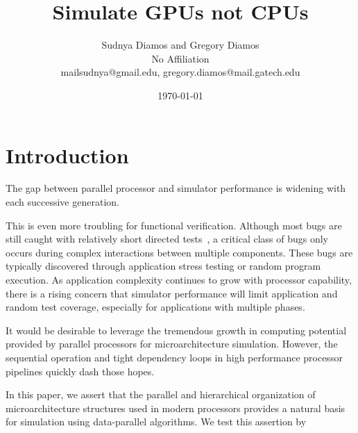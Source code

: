 \documentclass[conference, 10pt]{IEEEtran}
\begin{document}
 

\title{Simulate GPUs not CPUs}

\author{Sudnya Diamos and Gregory Diamos  \\
No Affiliation \\
{\small mailsudnya@gmail.edu, gregory.diamos@mail.gatech.edu}}
\date{\today}

\maketitle

\section{Introduction}

The gap between parallel processor and simulator performance is widening with
each successive generation.  


This is even more troubling for functional verification.  Although most bugs are
still caught with relatively short directed tests~\cite{ref:bug-distributions},
a critical class of bugs only occurs during complex interactions between
multiple components.  These bugs are typically discovered through application
stress testing or random program execution.   As application complexity
continues to grow with processor capability, there is a rising concern that
simulator performance will limit application and random test coverage,
especially for applications with multiple phases.  

It would be desirable to leverage the tremendous growth in computing potential
provided by parallel processors for microarchitecture simulation.  However,
the sequential operation and tight dependency loops in high performance 
processor pipelines quickly dash those hopes.  

In this paper, we assert that the parallel and hierarchical organization of
microarchitecture structures used in modern processors provides a natural
basis for simulation using data-parallel algorithms.  We test this assertion by
\end{document}
